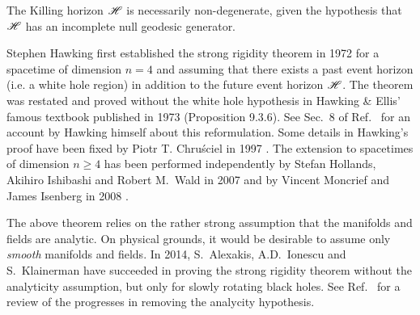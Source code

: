 \begin{remark}
The Killing horizon $\mathscr{H}$ is necessarily non-degenerate, given the hypothesis
that $\mathscr{H}$ has an incomplete null geodesic generator.
\end{remark}

\begin{hist}
Stephen Hawking first established the strong rigidity
theorem in 1972 \cite{Hawki72}
for a spacetime of dimension $n=4$ and assuming that there exists
a past event horizon (i.e. a white hole region) in addition to the
future event horizon $\mathscr{H}$.
The theorem was restated and proved without the white hole hypothesis
in Hawking \& Ellis' famous textbook published in 1973 \cite{HawkiE73}
(Proposition 9.3.6). See Sec.~8 of Ref.~\cite{Hawki73} for an account by Hawking himself
about this reformulation.
Some details in Hawking's proof have been fixed
by Piotr T. Chru\'sciel in 1997 \cite{Chrus97}.
The extension to spacetimes of
dimension $n\geq 4$ has been performed independently by
Stefan Hollands, Akihiro Ishibashi
and Robert M.~Wald in 2007 \cite{HollaIW07}
and by Vincent Moncrief and James Isenberg
in 2008 \cite{MoncrI08}.
\end{hist}

The above theorem relies on the rather strong assumption that
the manifolds and fields are analytic.
On physical grounds,
it would be desirable to assume only \emph{smooth} manifolds and fields.
In 2014, S.~Alexakis, A.D.~Ionescu and S.~Klainerman \cite{AlexaIK14}
have succeeded in proving the strong rigidity theorem without the analyticity
assumption, but only for slowly rotating black holes.
See Ref.~\cite{IonesK15} for a review of the progresses in removing
the analycity hypothesis.

